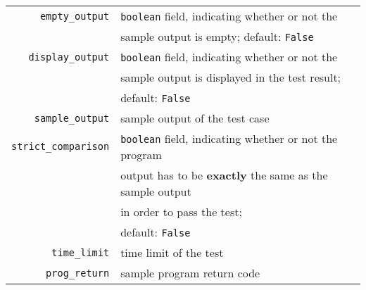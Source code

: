 \begin{table}[h]
\begin{tabular}[h]{r|l}
        \texttt{empty\_output} & \texttt{boolean} field, indicating whether or not the \\
            & sample output is empty; default: \texttt{False} \\
        \hline
        \texttt{display\_output} & \texttt{boolean} field, indicating whether or not the \\
            & sample output is displayed in the test result; \\ & default: \texttt{False} \\
        \hline
        \texttt{sample\_output} & sample output of the test case \\
        \hline
        \texttt{strict\_comparison} & \texttt{boolean} field, indicating
            whether or not the program \\
            & output has to be \textbf{exactly} the same as the sample output \\
            & in order to pass the test; \\
            & default: \texttt{False} \\
        \hline
        \hline
        \texttt{time\_limit} & time limit of the test \\
        \hline
        \texttt{prog\_return} & sample program return code \\
        \hline
    \end{tabular}
\end{table}

